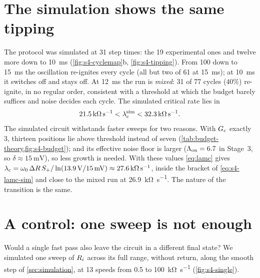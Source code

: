 \section{The simulation shows the same tipping}\label{sec:s4-sim}

The protocol was simulated at 31 step times: the 19 experimental ones and twelve more down to
\SI{10}{\milli\second} (\cref{fig:s4-cyclemap}b, \cref{fig:s4-tipping}). From \num{100} down to
\SI{15}{\milli\second} the oscillation re-ignites every cycle (all but two of 61 at
\SI{15}{\milli\second}); at \SI{10}{\milli\second} it switches off and stays off. At \SI{12}{\milli\second}
the run is \emph{mixed}: 31 of 77 cycles ($40\%$) re-ignite, in no regular order, consistent with a
threshold at which the budget barely suffices and noise decides each cycle. The simulated
critical rate lies in
\begin{equation}
  \SI{21.5}{\kilo\ohm\per\second} < \lambda_{c}^{\text{sim}} < \SI{32.3}{\kilo\ohm\per\second} .
  \label{eq:s4-lamc-sim}
\end{equation}
The simulated circuit withstands faster sweeps for two reasons. With $G_{c}$ exactly 3, thirteen positions
lie above threshold instead of seven (\cref{tab:budget-theory,fig:s4-budget}); and its effective noise
floor is larger ($\Lambda_{\mathrm{on}}=6.7$ in Stage~3, so $\delta\approx\SI{15}{\milli\volt}$), so less growth is needed.
With these values \cref{eq:lamc} gives $\lambda_{c}=\omega_{0}\,\Delta R\,S_{+}/\ln(\SI{13.9}{\volt}/\SI{15}{\milli\volt})
\approx\SI{27.6}{\kilo\ohm\per\second}$, inside the bracket of \cref{eq:s4-lamc-sim} and close to the mixed
run at \SI{26.9}{\kilo\ohm\per\second}. The nature of the transition is the same.

\section{A control: one sweep is not enough}\label{sec:s4-control}

Would a single fast pass also leave the circuit in a different final state? We simulated one sweep of
$R_{i}$ across its full range, without return, along the smooth step of \cref{sec:simulation}, at 13 speeds
from \num{0.5} to \SI{100}{\kilo\ohm\per\second} (\cref{fig:s4-single}).

